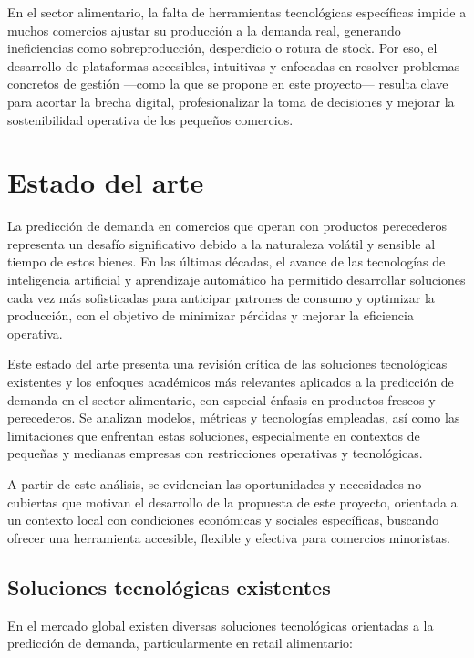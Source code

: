 En el sector alimentario, la falta de herramientas tecnológicas específicas impide a muchos comercios ajustar su producción a la demanda real, generando ineficiencias como sobreproducción, desperdicio o rotura de stock. Por eso, el desarrollo de plataformas accesibles, intuitivas y enfocadas en resolver problemas concretos de gestión —como la que se propone en este proyecto— resulta clave para acortar la brecha digital, profesionalizar la toma de decisiones y mejorar la sostenibilidad operativa de los pequeños comercios.

\newpage %

\section{Estado del arte}

La predicción de demanda en comercios que operan con productos perecederos representa un desafío significativo debido a la naturaleza volátil y sensible al tiempo de estos bienes. En las últimas décadas, el avance de las tecnologías de inteligencia artificial y aprendizaje automático ha permitido desarrollar soluciones cada vez más sofisticadas para anticipar patrones de consumo y optimizar la producción, con el objetivo de minimizar pérdidas y mejorar la eficiencia operativa.

Este estado del arte presenta una revisión crítica de las soluciones tecnológicas existentes y los enfoques académicos más relevantes aplicados a la predicción de demanda en el sector alimentario, con especial énfasis en productos frescos y perecederos. Se analizan modelos, métricas y tecnologías empleadas, así como las limitaciones que enfrentan estas soluciones, especialmente en contextos de pequeñas y medianas empresas con restricciones operativas y tecnológicas.

A partir de este análisis, se evidencian las oportunidades y necesidades no cubiertas que motivan el desarrollo de la propuesta de este proyecto, orientada a un contexto local con condiciones económicas y sociales específicas, buscando ofrecer una herramienta accesible, flexible y efectiva para comercios minoristas.


\subsection{Soluciones tecnológicas existentes}

En el mercado global existen diversas soluciones tecnológicas orientadas a la predicción de demanda, particularmente en retail alimentario:

